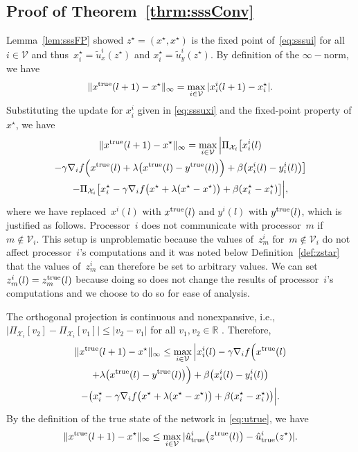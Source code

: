 \documentclass[9pt,shortpaper,twoside,web]{ieeecolor}
\newcommand{\R}{\ensuremath{\mathbb{R}}\xspace}
\newcommand{\X}{\ensuremath{\mathcal{X}}\xspace}
\newcommand{\V}{\ensuremath{\mathcal{V}}\xspace}
\newcommand{\tr}{\textnormal{true}}
\begin{document}
    \subsection{Proof of Theorem~\ref{thrm:sssConv}} \label{app:main}
    Lemma~\ref{lem:sssFP} showed $z^\star=(x^\star,x^\star)$ is the fixed point of~\eqref{eq:sssui} for all $i\in\V$
    and thus~$x^\star_i=\tilde{u}^i_x(z^\star)$ and $x^\star_i=\tilde{u}^i_y(z^\star)$.
    By definition of the $\infty-$norm, we have
    \begin{equation}
        \Vert x^\tr(l+1)-x^\star\Vert_\infty = \max_{i\in\V}\vert x^i_i(l+1)-x^\star_i\vert.
    \end{equation}
    Substituting the update for $x^i_i$ given in \eqref{eq:sssuxi} and the fixed-point property of $x^\star$, we have    
    \begin{multline}\label{eq:refback}
        \Vert x^\tr(l+1)-x^\star\Vert_\infty = \max_{i\in\V}\Big\vert \Pi_{\X_i}\big[x^i_i(l)
        \\-\gamma\nabla_if\Big(x^\tr(l)+\lambda\big(x^\tr(l)-y^\tr(l)\big)\Big)+\beta\big(x^i_i(l)-y^i_i(l)\big)\big]
        \\ - \Pi_{\X_i}\big[x^\star_i-\gamma\nabla_if\big(x^\star+\lambda(x^\star-x^\star)\big)+\beta(x^\star_i-x^\star_i)\big]\Big\vert,
    \end{multline}
    where we have replaced~$x^i(l)$ with $x^\tr(l)$ and $y^i(l)$ with $y^\tr(l)$, which is justified
    as follows. 
    Processor~$i$ does not communicate with processor~$m$ if~$m \not \in \V_i$. 
    This setup is unproblematic because the values of~$z^i_m$
    for~$m \not\in \V_i$ do not affect processor~$i$'s computations and
    it was noted below Definition~\ref{def:zstar} that the values of~$z^i_m$
    can therefore be set to arbitrary values. 
    We can set~$z^i_m(l) = z^{\tr}_m(l)$ because doing
    so does not change the results of processor~$i$'s computations and
    we choose to do so for ease of analysis. 
    
    The orthogonal projection is continuous and nonexpansive, i.e., $\vert \Pi_{\X_i}[v_2]-\Pi_{\X_i}[v_1]\vert\leq \vert v_2-v_1\vert$ for all $v_1,v_2\in\R$ \cite{bertsekas1989parallel}.
    Therefore, 
    \begin{multline}
        \Vert x^\tr(l+1)-x^\star\Vert_\infty \leq \max_{i\in\V}\Big\vert x^i_i(l)-\gamma\nabla_i f\Big(x^\tr(l)
        \\+\lambda\big(x^\tr(l)-y^\tr(l)\big)\Big) + \beta\big(x^i_i(l)-y^i_i(l)\big) \\- \big(x^\star_i-\gamma\nabla_if\big(x^\star + \lambda(x^\star-x^\star)\big)+\beta(x^\star_i-x^\star_i)\big)\Big\vert.
    \end{multline}
    By the definition of the true state of the network in \eqref{eq:utrue}, we have
    \begin{equation}\label{eq:sssproof12}
        \Vert x^\tr(l+1)-x^\star\Vert_\infty \leq \max_{i\in\V}\vert \hat{u}^i_\tr\big(z^\tr(l)\big)-\hat{u}^i_\tr(z^\star)\vert.
    \end{equation}
\end{document}
